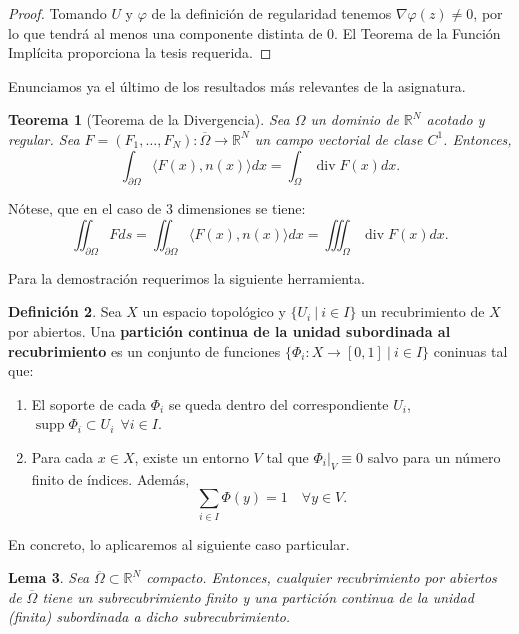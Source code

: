\documentclass[12pt,spanish]{article}
\newtheorem{theorem}{Teorema}[section]
\newtheorem{lemma}[theorem]{Lema}
\theoremstyle{definition}
\newtheorem{definition}[theorem]{Definici\'on}
\theoremstyle{remark}
\begin{document}
\begin{proof}
	Tomando $U$ y $\varphi$ de la definición de regularidad tenemos $\nabla\varphi(z)\neq 0$, por lo que tendrá al menos una componente distinta de 0. El Teorema de la Función Implícita proporciona la tesis requerida.
\end{proof}

Enunciamos ya el último de los resultados más relevantes de la asignatura.

\begin{theorem}[Teorema de la Divergencia]
	Sea $\Omega$ un dominio de $\mathbb{R}^N$ acotado y regular. Sea $F=(F_1,\ldots,F_N):\overline{\Omega}\rightarrow\mathbb{R}^N$ un campo vectorial de clase $C^1$.
	Entonces,
	\[\int_{\partial\Omega}\langle F(x),n(x)\rangle dx=\int_\Omega \operatorname{div}F(x)dx.\]
\end{theorem}

Nótese, que en el caso de 3 dimensiones se tiene:
\[\iint_{\partial\Omega} F ds=\iint_{\partial\Omega}\langle F(x),n(x)\rangle dx=\iiint_\Omega \operatorname{div}F(x)dx.\]

Para la demostración requerimos la siguiente herramienta.

\begin{definition}
	Sea $X$ un espacio topológico y $\{U_i \ | \ i \in I\}$ un recubrimiento de $X$ por abiertos. Una \textbf{partición continua de la unidad subordinada al recubrimiento} es un conjunto de funciones $\{\Phi_i:X\rightarrow[0,1] \ | \ i\in I\}$ coninuas tal que:
	\begin{enumerate}[$(a)$]
		\item El soporte de cada $\Phi_i$ se queda dentro del correspondiente $U_i$, $\operatorname{supp}\Phi_i\subset U_i\ \ \forall i\in I$.
		\item Para cada $x\in X$, existe un entorno $V$ tal que $\Phi_i|_V\equiv 0$ salvo para un número finito de índices. Además, \[
		\sum_{i\in I}\Phi(y)=1\quad\forall y\in V.\]
	\end{enumerate}
\end{definition}

En concreto, lo aplicaremos al siguiente caso particular.

\begin{lemma}\label{lm:particion-subrecubrimiento}
	Sea $\overline{\Omega}\subset\mathbb{R}^N$ compacto. Entonces, cualquier recubrimiento por abiertos de $\overline{\Omega}$ tiene un subrecubrimiento finito y una partición continua de la unidad (finita) subordinada a dicho subrecubrimiento.
\end{lemma}
\end{document}
